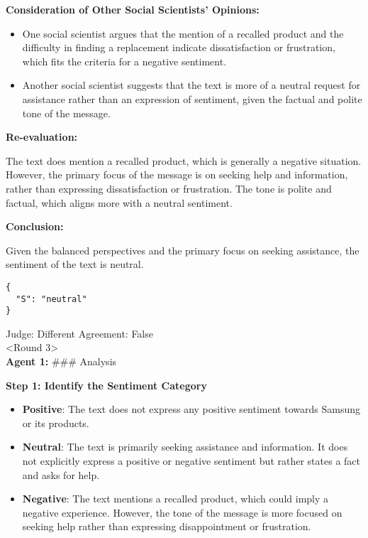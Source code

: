 \textbf{Consideration of Other Social Scientists'
Opinions:}

\begin{itemize}
\tightlist
\item
  One social scientist argues that the mention of a recalled product and
  the difficulty in finding a replacement indicate dissatisfaction or
  frustration, which fits the criteria for a negative sentiment.
\item
  Another social scientist suggests that the text is more of a neutral
  request for assistance rather than an expression of sentiment, given
  the factual and polite tone of the message.
\end{itemize}

\textbf{Re-evaluation:}

The text does mention a recalled product, which is generally a negative
situation. However, the primary focus of the message is on seeking help
and information, rather than expressing dissatisfaction or frustration.
The tone is polite and factual, which aligns more with a neutral
sentiment.

\textbf{Conclusion:}

Given the balanced perspectives and the primary focus on seeking
assistance, the sentiment of the text is neutral.

\begin{verbatim}
{
  "S": "neutral"
}
\end{verbatim}

Judge: Different Agreement: False\\

<Round 3>\\

\textbf{Agent 1:} \#\#\# Analysis

\textbf{Step 1: Identify the Sentiment Category}

\begin{itemize}
\tightlist
\item
  \textbf{Positive}: The text does not express any positive sentiment
  towards Samsung or its products.
\item
  \textbf{Neutral}: The text is primarily seeking assistance and
  information. It does not explicitly express a positive or negative
  sentiment but rather states a fact and asks for help.
\item
  \textbf{Negative}: The text mentions a recalled product, which could
  imply a negative experience. However, the tone of the message is more
  focused on seeking help rather than expressing disappointment or
  frustration.
\end{itemize}

